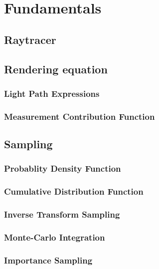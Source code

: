 \chapter{Fundamentals}
\label{ch:Fundamentals}

\section{Raytracer}


\section{Rendering equation}

\subsection{Light Path Expressions}
\subsection{Measurement Contribution Function}


\section{Sampling}

\subsection{Probablity Density Function}

\subsection{Cumulative Distribution Function}

\subsection{Inverse Transform Sampling}

\subsection{Monte-Carlo Integration}

\subsection{Importance Sampling}

